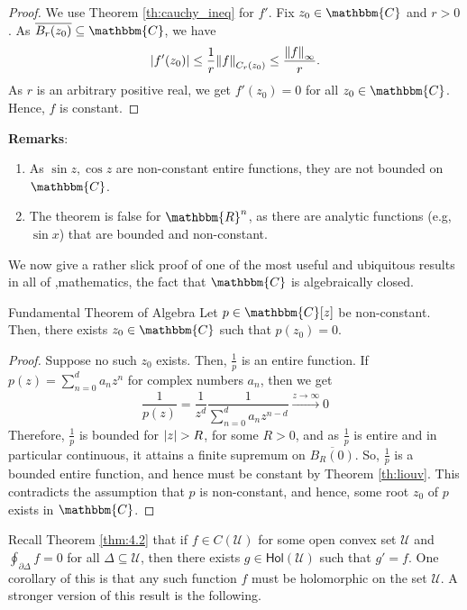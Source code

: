 \documentclass[../ComplexAnalysis_Notes.tex]{subfiles}
\begin{document}
\begin{proof} 
 We use Theorem \ref{th:cauchy_ineq} for \( f' \). Fix \( z_0 \in \mathbbm{C} \) and \( r > 0 \). As \( \overline{B_r(z_0)} \subseteq \mathbbm{C} \), we have
 \[ 
  \abs{f'(z_0)} \leq \frac{1}{r} \norm{f}_{C_r(z_0)} \leq \frac{\norm{f}_{\infty}}{r}.
  \]
  As \( r \) is an arbitrary positive real, we get \( f'(z_0) = 0 \) for all \( z_0 \in \mathbbm{C} \). Hence, \( f \) is constant.
 \end{proof}
\pagebreak

\textbf{Remarks}: \begin{enumerate}[label = (\arabic*)]
  \item As \( \sin z, \cos z \) are non-constant entire functions, they are not bounded on \( \mathbbm{C} \).
  \item The theorem is false for \( \mathbbm{R}^n \), as there are analytic functions (e.g, \( \sin x \)) that are bounded and non-constant.
\end{enumerate}

We now give a rather slick proof of one of the most useful and ubiquitous results in all of ,mathematics, the fact that \( \mathbbm{C} \) is algebraically closed.

\begin{Thm}{Fundamental Theorem of Algebra}{}
 Let \( p \in \mathbbm{C}[z] \) be non-constant. Then, there exists \( z_0 \in \mathbbm{C} \) such that \( p(z_0) = 0 \).
 \end{Thm}

\begin{proof} 
 Suppose no such \( z_0 \) exists. Then, \( \frac{1}{p} \) is an entire function. If \( p(z) = \sum_{n=0}^{d}a_nz^n \) for complex numbers \( a_n \), then we get
 \[ 
  \frac{1}{p(z)} = \frac{1}{z^d} \frac{1}{\sum_{n=0}^{d}a_{n}z^{n-d}} \xrightarrow{z \to \infty} 0
  \]
  Therefore, \( \frac{1}{p} \) is bounded for \( \abs{z} > R \), for some \( R > 0 \), and as \( \frac{1}{p} \) is entire and in particular continuous, it attains a finite supremum on \( \overline{B_R(0)} \). So, \( \frac{1}{p} \) is a bounded entire function, and hence must be constant by Theorem \ref{th:liouv}. This contradicts the assumption that \( p \) is non-constant, and hence, some root \( z_0 \) of \( p \) exists in \( \mathbbm{C} \).
 \end{proof}

Recall Theorem \ref{thm:4.2} that if \( f \in C(\mathcal{U}) \) for some open convex set \( \mathcal{U} \) and \( \oint_{\partial\Delta} f = 0 \) for all \( \Delta \subseteq \mathcal{U} \), then there exists \( g \in \textsf{Hol}(\mathcal{U}) \) such that \( g' = f \). One corollary of this is that any such function \( f \) must be holomorphic on the set \( \mathcal{U} \). A stronger version of this result is the following.
\end{document}
